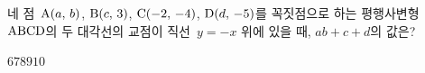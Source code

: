 네 점~$\mathrm{A}(a,\,b)$, $\mathrm{B}(c,\,3)$, $\mathrm{C}(-2,\,-4)$, $\mathrm{D}(d,\,-5)$를 꼭짓점으로 하는 평행사변형~$\mathrm{ABCD}$의 두 대각선의 교점이 직선~$y=-x$ 위에 있을 때, $ab+c+d$의 값은?
\begin{choices32}{$6$}{$7$}{$8$}{$9$}{$10$}\end{choices32}
